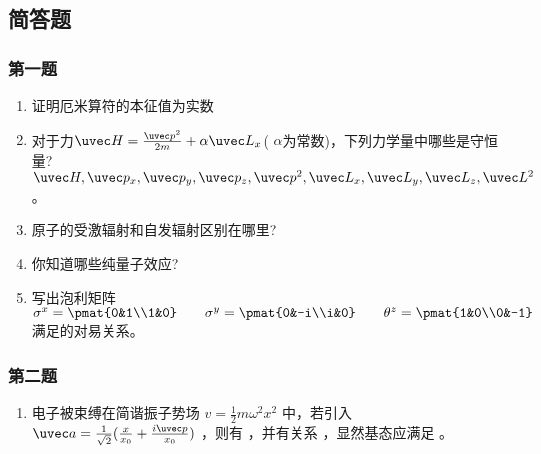 
\subsection{简答题}
\subsubsection{第一题}
\begin{enumerate}
\item 证明厄米算符的本征值为实数
\item 对于力$\uvec H=\frac{\uvec p^2}{2m}+\alpha \uvec L_x$( $\alpha$为常数)，下列力学量中哪些是守恒量?\\
$\uvec H,\uvec p_x,\uvec p_y,\uvec p_z,\uvec p^2,\uvec L_x,\uvec L_y,\uvec L_z,\uvec L^2$。
\item 原子的受激辐射和自发辐射区别在哪里?
\item 你知道哪些纯量子效应?
\item 写出泡利矩阵
$\sigma^x=\pmat{0&1\\1&0}\qquad \sigma^y=\pmat{0&-i\\i&0}\qquad \theta^z=\pmat{1&0\\0&-1}$满足的对易关系。
\end{enumerate}
\subsubsection{第二题}
\begin{enumerate}
\item 电子被束缚在简谐振子势场 $v=\frac{1}{2}m\omega^2x^2$  中，若引入 $\uvec a =\frac{1}{\sqrt{2}}(\frac{x}{x_0}+\frac{i\uvec p}{x_0})$ ，则有   ，并有关系    ，显然基态应满足  。
\end{enumerate}
